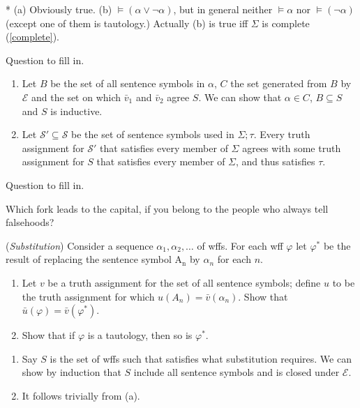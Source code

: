 * (a) Obviously true. (b) $\vDash(\alpha\vee\neg \alpha)$, but in general neither $\vDash \alpha$ nor $\vDash (\neg \alpha)$ (except one of them is tautology.) Actually (b) is true iff $\Sigma$ is complete (\ref{complete}).

\begin{exercise}
  Question to fill in.
\end{exercise}

\begin{enumerate}[label=(\alph*)]
  \item Let $B$ be the set of all sentence symbols in $\alpha$, $C$ the set generated from $B$ by $\mathcal{E}$ and the set on which $\bar{v}_1$ and $\bar{v}_2$ agree $S$. We can show that $\alpha\in C$, $B\subseteq S$ and $S$ is inductive.
  \item Let $\mathcal{S}'\subseteq \mathcal{S}$ be the set of sentence symbols used in $\Sigma;\tau$. Every truth assignment for $\mathcal{S}'$ that satisfies every member of $\Sigma$ agrees with some truth assignment for $S$ that satisfies every member of $\Sigma$, and thus satisfies $\tau$.
\end{enumerate}

\begin{exercise}
  Question to fill in.
\end{exercise}

Which fork leads to the capital, if you belong to the people who always tell falsehoods?

\begin{exercise}
  (\textit{Substitution}) Consider a sequence $\alpha_1,\alpha_2,\dots$ of wffs. For each wff $\varphi$ let $\varphi^*$ be the result of replacing the sentence symbol $\mathrm{A_n}$ by $\alpha_n$ for each $n$.\begin{enumerate}[label=(\alph*)]
    \item Let $v$ be a truth assignment for the set of all sentence symbols; define $u$ to be the truth assignment for which $u(A_n)=\bar{v}(\alpha_n)$. Show that $\bar{u}(\varphi)=\bar{v}(\varphi^*)$.
    \item Show that if $\varphi$ is a tautology, then so is $\varphi^*$.\qedhere
  \end{enumerate}
\end{exercise}

\begin{enumerate}[label=(\alph*)]
  \item Say $S$ is the set of wffs such that satisfies what substitution requires. We can show by induction that $S$ include all sentence symbols and is closed under $\mathcal{E}$.
  \item It follows trivially from (a).
\end{enumerate}

